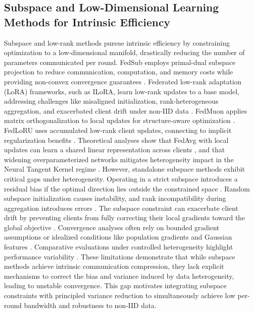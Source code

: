 \documentclass[11pt]{article}
\begin{document}
\subsection{Subspace and Low-Dimensional Learning Methods for Intrinsic Efficiency}
Subspace and low-rank methods pursue intrinsic efficiency by constraining optimization to a low-dimensional manifold, drastically reducing the number of parameters communicated per round. FedSub employs primal-dual subspace projection to reduce communication, computation, and memory costs while providing non-convex convergence guarantees \citep{zhang2025efficient}. Federated low-rank adaptation (LoRA) frameworks, such as ILoRA, learn low-rank updates to a base model, addressing challenges like misaligned initialization, rank-heterogeneous aggregation, and exacerbated client drift under non-IID data \citep{Zhou2025ILoRAFL}. FedMuon applies matrix orthogonalization to local updates for structure-aware optimization \citep{liu2025fedmuon}. FedLoRU uses accumulated low-rank client updates, connecting to implicit regularization benefits \citep{Park2024CommunicationEfficientFL}. Theoretical analyses show that FedAvg with local updates can learn a shared linear representation across clients \citep{collins2022fedavg}, and that widening overparameterized networks mitigates heterogeneity impact in the Neural Tangent Kernel regime \citep{jian2025widening}. However, standalone subspace methods exhibit critical gaps under heterogeneity. Operating in a strict subspace introduces a residual bias if the optimal direction lies outside the constrained space \citep{zhang2025efficient}. Random subspace initialization causes instability, and rank incompatibility during aggregation introduces errors \citep{Zhou2025ILoRAFL}. The subspace constraint can exacerbate client drift by preventing clients from fully correcting their local gradients toward the global objective \citep{Zhou2025ILoRAFL, zhang2025efficient}. Convergence analyses often rely on bounded gradient assumptions or idealized conditions like population gradients and Gaussian features \citep{zhang2025efficient, collins2022fedavg}. Comparative evaluations under controlled heterogeneity highlight performance variability \citep{reguieg2023comparative}. These limitations demonstrate that while subspace methods achieve intrinsic communication compression, they lack explicit mechanisms to correct the bias and variance induced by data heterogeneity, leading to unstable convergence. This gap motivates integrating subspace constraints with principled variance reduction to simultaneously achieve low per-round bandwidth and robustness to non-IID data.



\end{document}
